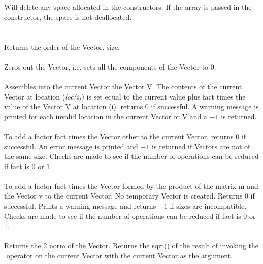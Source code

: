  \\
\\ 
Will delete any space allocated in the constructors. If the array is
passed in the constructor, the space is not deallocated.\\

  \\
 \\
Returns the order of the Vector, \p size. \\

 \\
Zeros out the Vector, i.e. sets all the components of the Vector to
$0$. \\

 \\
Assembles into the current Vector the Vector \p V. The contents of the
current Vector at location ({\em loc(i)}) is set equal to the current
value plus \p fact times the value of the Vector \p V at
location (\p i). returns $0$ if successful. A warning message is
printed for each invalid location in the current Vector or \p V and a
$-1$ is returned. \\ 

 \\
To add a factor \p fact times the Vector \p other to the current
Vector. returns $0$ if successful. An error message is printed and
$-1$ is returned if Vectors are not of the same size. Checks are made
to see if the number of operations can be reduced if \p fact is $0$
or $1$. \\ 

 \\ 
To add a factor \p fact times the Vector formed by the product of
the matrix \p m and the Vector \p v to the current Vector. No
temporary Vector is created. Returns $0$ if successful. Prints a
warning message and returns $-1$ if sizes are incompatible. Checks are
made to see if the number of operations can be reduced if \p fact
is $0$ or $1$. \\ 


 \\
Returns the 2 norm of the Vector. Returns the sqrt() of the
result of invoking the $\hat{ }$ operator on the current Vector with
the current Vector as the argument. \\ 

